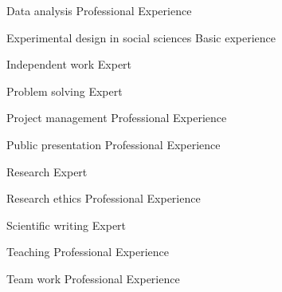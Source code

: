 \documentclass[11pt, a4]{academic-cv}
\begin{document}
\begin{cvskills}
\cvskill
{}
{Data analysis}
{Professional Experience}

\cvskill
{}
{Experimental design in social sciences}
{Basic experience}

\cvskill
{}
{Independent work}
{Expert}

\cvskill
{}
{Problem solving}
{Expert}

\cvskill
{}
{Project management}
{Professional Experience}

\cvskill
{}
{Public presentation}
{Professional Experience}

\cvskill
{}
{Research}
{Expert}

\cvskill
{}
{Research ethics}
{Professional Experience}

\cvskill
{}
{Scientific writing}
{Expert}

\cvskill
{}
{Teaching}
{Professional Experience}

\cvskill
{}
{Team work}
{Professional Experience}

\end{cvskills}


\end{document}
